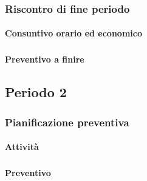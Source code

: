 \subsubsection{Riscontro di fine periodo}


\paragraph{Consuntivo orario ed economico}
\subparagraph*{}

\contabilitaTable{
	
}


\paragraph{Preventivo a finire}
\subparagraph*{}


\pagebreak
\subsection{Periodo 2}

\subsubsection{Pianificazione preventiva}

\paragraph{Attività}
\subparagraph*{}

\planningTable{
	
}



\paragraph{Preventivo}
\subparagraph*{}

